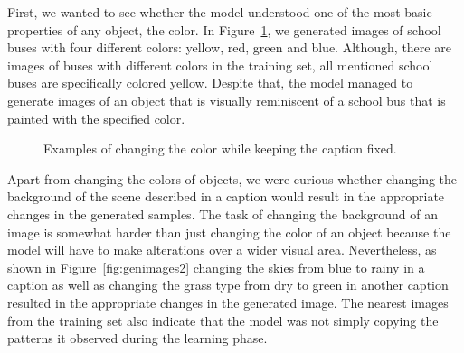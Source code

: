 \documentclass{article} %
\begin{document}
First, we wanted to see whether the model understood one of the most basic properties of any object, the color. In Figure~\ref{fig:genimages1}, we generated images of school buses with four different colors: yellow, red, green and blue. Although, there are images of buses with different colors in the training set, all mentioned school buses are specifically colored yellow. Despite that, the model managed to generate images of an object that is visually reminiscent of a school bus that is painted with the specified color.

\begin{figure}[!h]
\captionsetup[subfigure]{labelformat=empty}
\begin{center}
\quad
%
\quad
%
\quad
%
\quad
%
\end{center}
\caption{Examples of changing the color while keeping the caption fixed.}
\label{fig:genimages1}
\vspace{-0.3cm}
\end{figure}

Apart from changing the colors of objects, we were curious whether changing the background of the scene described in a caption would result in the appropriate changes in the generated samples. The task of changing the background of an image is somewhat harder than just changing the color of an object because the model will have to make alterations over a wider visual area. Nevertheless, as shown in Figure~\ref{fig:genimages2} changing the skies from blue to rainy in a caption as well as changing the grass type from dry to green in another caption resulted in the appropriate changes in the generated image. The nearest images from the training set also indicate that the model was not simply copying the patterns it observed during the learning phase.
\end{document}
